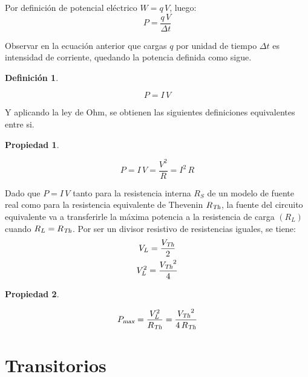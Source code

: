 \documentclass[a5paper,12pt,twoside]{book}
\newtheorem{defn}{{Definición}}[chapter]
\newtheorem{prop}{{Propiedad}}[chapter]
\begin{document}
Por definición de potencial eléctrico $W = q \, V$, luego:
\begin{equation*}
    P = \frac{q \, V}{\Delta t}
\end{equation*}

Observar en la ecuación anterior que cargas $q$ por unidad de tiempo $\Delta t$ es intensidad de corriente, quedando la potencia definida como sigue.

\begin{mdframed}[style=MyFrame1]
    \begin{defn}
    \end{defn}
    \begin{equation*}
        P = I \, V
    \end{equation*}
\end{mdframed}

Y aplicando la ley de Ohm, se obtienen las siguientes definiciones equivalentes entre si.

\begin{mdframed}[style=MyFrame1]
    \begin{prop}
    \end{prop}
    \begin{equation*}
        P = I \, V = \frac{V^2}{R} = I^2 \, R
    \end{equation*}
\end{mdframed}

Dado que $P = I \, V$ tanto para la resistencia interna $R_S$ de un modelo de fuente real como para la resistencia equivalente de Thevenin ${{R}_\textsl{{Th}}}$, la fuente del circuito equivalente va a transferirle la máxima potencia a la resistencia de carga $(R_L)$ cuando $R_L={{R}_\textsl{{Th}}}$. Por ser un divisor resistivo de resistencias iguales, se tiene:
\begin{gather*}
    V_L = \frac{{{V}_\textsl{{Th}}}}{2}
    \\
    V_L^2 = \frac{{{V}_\textsl{{Th}}}^2}{4}
\end{gather*}

\begin{mdframed}[style=MyFrame1]
    \begin{prop}
    \end{prop}
    \begin{equation*}
        {{P}_\textsl{{max}}} = \frac{V_L^2}{{{R}_\textsl{{Th}}}} = \frac{{{V}_\textsl{{Th}}}^2}{4 \, {{R}_\textsl{{Th}}}}
    \end{equation*}
\end{mdframed}


\chapter{Transitorios}
\end{document}
